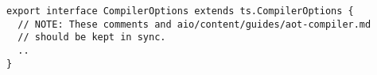 \begin{verbatim}
export interface CompilerOptions extends ts.CompilerOptions {
  // NOTE: These comments and aio/content/guides/aot-compiler.md
  // should be kept in sync.
  ..
}
\end{verbatim}
